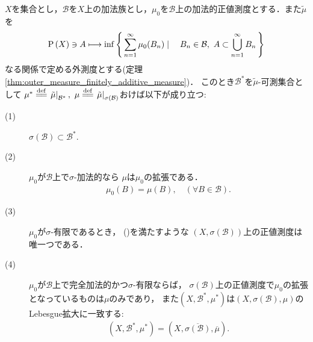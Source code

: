 		\begin{screen}
			\begin{thm}\label{thm:appendix_Kolmogorov_Hopf}
				$X$を集合とし，$\mathcal{B}$を$X$上の加法族とし，$\mu_0$を$\mathcal{B}$上の加法的正値測度とする．また$\tilde{\mu}$を
				\begin{align}
					\operatorname*{P} \left(X\right) \ni A \longmapsto 
					\operatorname*{inf}_{} \left\{\, \sum_{n=1}^\infty \mu_0(B_n) \mid \quad B_n \in \mathcal{B},\ A \subset \bigcup_{n=1}^\infty B_n\, \right\}
				\end{align}
				なる関係で定める外測度とする(定理\ref{thm:outer_measure_finitely_additive_measure})．
				このとき$\mathcal{B}^*$を$\tilde{\mu}$-可測集合として
				$\mu^* \defeq \left.\tilde{\mu}\right|_{\mathcal{B}^*},
				\ \mu \defeq \left.\tilde{\mu}\right|_{\sigma(\mathcal{B})}$おけば以下が成り立つ:
				\begin{description}
					\item[(1)] $\sigma(\mathcal{B}) \subset \mathcal{B}^*.$
					
					\item[(2)] $\mu_0$が$\mathcal{B}$上で$\sigma$-加法的なら
						$\mu$は$\mu_0$の拡張である．
						\begin{align}
							\mu_0(B) = \mu(B),\quad (\forall B \in \mathcal{B}).
							\label{eq:appendix_finite_additive_measure_expansion_1}
						\end{align}
						
					\item[(3)] $\mu_0$が$\sigma$-有限であるとき，
						()を満たすような
						$\left( X,\sigma(\mathcal{B}) \right)$上の正値測度は唯一つである．
					
					\item[(4)] $\mu_0$が$\mathcal{B}$上で完全加法的かつ$\sigma$-有限ならば，
						$\sigma(\mathcal{B})$上の正値測度で$\mu_0$の拡張となっているものは$\mu$のみであり，
						また$\left( X,\mathcal{B}^*,\mu^* \right)$は$(X,\sigma(\mathcal{B}),\mu)$の
						Lebesgue拡大に一致する:
						\begin{align}
							\left( X,\mathcal{B}^*,\mu^* \right) 
							= \left( X,\overline{\sigma(\mathcal{B})},\overline{\mu} \right).
							\label{eq:appendix_finite_additive_measure_expansion_5}
						\end{align}
				\end{description}
			\end{thm}
		\end{screen}
		
